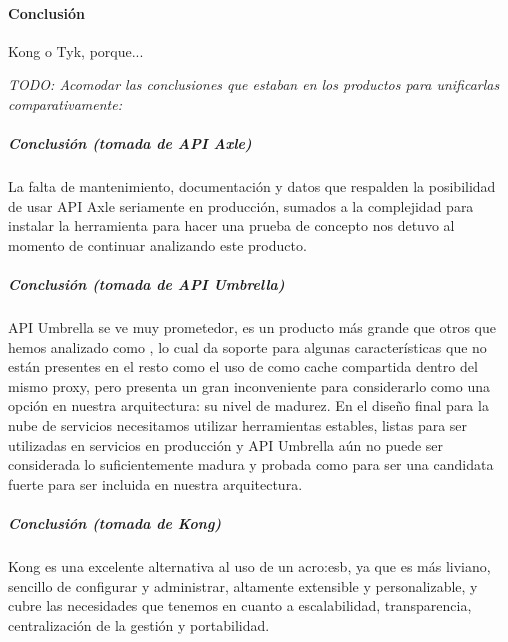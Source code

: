 \paragraph{Conclusión}

Kong o Tyk, porque...

\textit{TODO: Acomodar las conclusiones que estaban en los productos para unificarlas comparativamente:}

\subparagraph{Conclusión (tomada de API Axle)}

La falta de mantenimiento, documentación y datos que respalden la posibilidad de usar API Axle seriamente en producción, sumados a la complejidad para instalar la herramienta para hacer una prueba de concepto nos detuvo al momento de continuar analizando este producto.

\subparagraph{Conclusión (tomada de API Umbrella)}

API Umbrella se ve muy prometedor, es un producto más grande que otros que hemos analizado como , lo cual da soporte para algunas características que no están presentes en el resto como el uso de  como cache compartida dentro del mismo proxy, pero presenta un gran inconveniente para considerarlo como una opción en nuestra arquitectura: su nivel de madurez. En el diseño final para la nube de servicios necesitamos utilizar herramientas estables, listas para ser utilizadas en servicios en producción y API Umbrella aún no puede ser considerada lo suficientemente madura y probada como para ser una candidata fuerte para ser incluida en nuestra arquitectura.

\subparagraph{Conclusión (tomada de Kong)}

Kong es una excelente alternativa al uso de un \gls{acro:esb}, ya que es más liviano, sencillo de configurar y administrar, altamente extensible y personalizable, y cubre las necesidades que tenemos en cuanto a escalabilidad, transparencia, centralización de la gestión y portabilidad.
